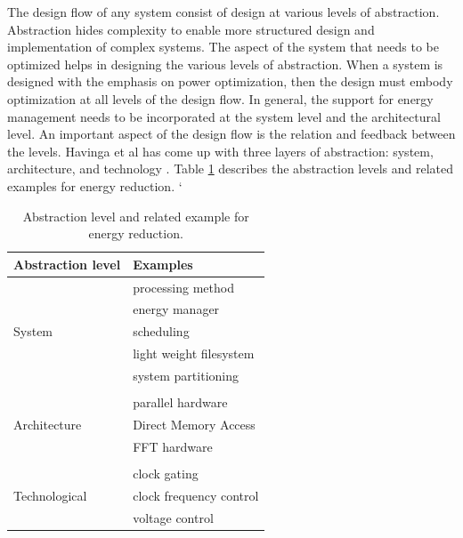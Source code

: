 The design flow of any system consist of design at various levels of
abstraction. Abstraction hides complexity to enable more structured
design and implementation of complex systems. The aspect of the
system that needs to be optimized helps in designing the various
levels of abstraction. When a system is designed with the emphasis on
power optimization, then the design must embody optimization at all
levels of the design flow. In general, the support for energy
management needs to be incorporated at the system level and the
architectural level. An important aspect of the design flow is the
relation and feedback between the levels. Havinga et al has come up
with three layers of abstraction: system, architecture, and
technology \cite{havinga, havinga2, havinga3}. Table
\ref{table:abstraction} describes the abstraction levels and related
examples for energy reduction.
`
 \begin{table}
 	\caption{Abstraction level and related example for energy reduction.}
 	\label{table:abstraction}
 	\centering
 	\begin{tabular}{|l|l|}
 		\hline
 		Abstraction level & Examples  \\
 		\hline
 		  & processing method \\
 		  & energy manager \\
 		  System & scheduling \\
 		  & light weight filesystem \\
 		  & system partitioning \\
 		  & \\
 		  & parallel hardware \\
 		  Architecture & Direct Memory Access \\
 		  & FFT hardware \\
 		  &  \\
 		  & clock gating \\
 		  Technological & clock frequency control \\
 		  & voltage control \\
 		\hline
 	\end{tabular}
 \end{table}


